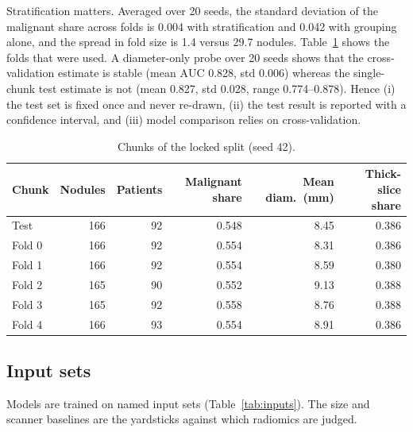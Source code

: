 \documentclass[journal]{IEEEtran}
\newcommand{\auc}{\mathrm{AUC}}
\begin{document}
Stratification matters. Averaged over 20 seeds, the standard deviation of the malignant share across
folds is 0.004 with stratification and 0.042 with grouping alone, and the spread in fold size is 1.4
versus 29.7 nodules. Table~\ref{tab:folds} shows the folds that were used. A diameter-only probe over
20 seeds shows that the cross-validation estimate is stable (mean $\auc$ 0.828, std 0.006) whereas the
single-chunk test estimate is not (mean 0.827, std 0.028, range 0.774--0.878). Hence (i) the test set is
fixed once and never re-drawn, (ii) the test result is reported with a confidence interval, and
(iii) model comparison relies on cross-validation.

\begin{table}[!t]
\caption{Chunks of the locked split (seed 42).}
\label{tab:folds}
\centering\small
\begin{tabular}{lrrrrr}
\toprule
Chunk & Nodules & Patients & Malignant share & Mean diam.\ (mm) & Thick-slice share\\
\midrule
Test    & 166 & 92 & 0.548 & 8.45 & 0.386\\
Fold 0  & 166 & 92 & 0.554 & 8.31 & 0.386\\
Fold 1  & 166 & 92 & 0.554 & 8.59 & 0.380\\
Fold 2  & 165 & 90 & 0.552 & 9.13 & 0.388\\
Fold 3  & 165 & 92 & 0.558 & 8.76 & 0.388\\
Fold 4  & 166 & 93 & 0.554 & 8.91 & 0.386\\
\bottomrule
\end{tabular}
\end{table}

\subsection{Input sets}
Models are trained on named input sets (Table~\ref{tab:inputs}). The size and scanner baselines
are the yardsticks against which radiomics are judged.
\end{document}
